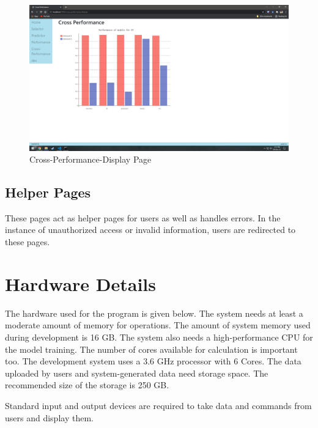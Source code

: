 \begin{figure}[H]
  \centering
  \includegraphics[width=0.7\columnwidth]{media/website/pages/05_cross_performance_display.png}
  \caption{Cross-Performance-Display Page}
  \label{fig:web_cross_performance_display_page}
\end{figure}

\subsection{Helper Pages} \label{subsec:helper_page}
These pages act as helper pages for users as well as handles errors. In the instance of unauthorized access or invalid information, users are redirected to these pages.

\section{Hardware Details} \label{sec:hardware_details}
The hardware used for the program is given below. The system needs at least a moderate amount of memory for operations. The amount of system memory used during development is 16 GB. The system also needs a high-performance CPU for the model training. The number of cores available for calculation is important too. The development system uses a 3.6 GHz processor with 6 Cores. The data uploaded by users and system-generated data need storage space. The recommended size of the storage is 250 GB.

Standard input and output devices are required to take data and commands from users and display them.

